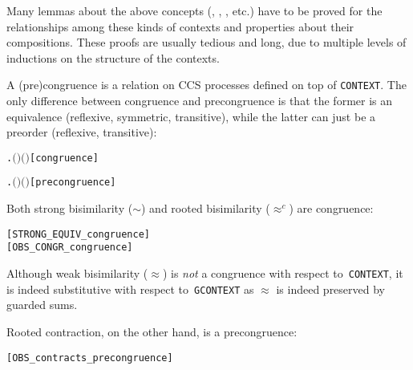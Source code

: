 Many lemmas about the above concepts (, ,
, etc.) have to be proved for the
 relationships among these kinds of contexts and properties about their
 compositions. These proofs are usually tedious and long,  due to multiple levels of
 inductions on the structure of the contexts.

A (pre)congruence is a relation on CCS processes defined on top of
\texttt{CONTEXT}. The only difference between congruence and
precongruence is that the former  is an equivalence (reflexive,
symmetric, transitive), while the latter can  just be  a preorder (reflexive, transitive):
\begin{alltt}
     \HOLTokenDefEquality{}
       \HOLSymConst{\HOLTokenConj{}} \HOLSymConst{\HOLTokenForall{}}  .   \HOLSymConst{\HOLTokenImp{}}    \HOLSymConst{\HOLTokenImp{}}  \ensuremath{(} \ensuremath{)} \ensuremath{(} \ensuremath{)}\hfill{[congruence]}

     \HOLTokenDefEquality{}
       \HOLSymConst{\HOLTokenConj{}} \HOLSymConst{\HOLTokenForall{}}  .   \HOLSymConst{\HOLTokenImp{}}    \HOLSymConst{\HOLTokenImp{}}  \ensuremath{(} \ensuremath{)} \ensuremath{(} \ensuremath{)}\hfill{[precongruence]}
\end{alltt}

Both strong bisimilarity ($\sim$) and
rooted bisimilarity ($\approx^c$) are congruence:
\begin{alltt}
\HOLTokenTurnstile{}  \hfill{[STRONG_EQUIV_congruence]}
\HOLTokenTurnstile{}  \hfill{[OBS_CONGR_congruence]}
\end{alltt}

Although weak bisimilarity ($\approx$) is \emph{not} a congruence
  with respect to~\texttt{CONTEXT}, it is indeed substitutive
  with respect to~\texttt{GCONTEXT} 
as $\approx$ is indeed preserved by guarded sums.

Rooted contraction, on the other hand, is a precongruence:
\begin{alltt}
\HOLTokenTurnstile{}  \hfill{[OBS_contracts_precongruence]}
\end{alltt}

  